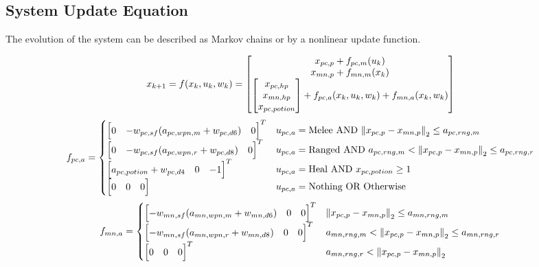 \documentclass[letterpaper, 10 pt, conference]{ieeeconf}
\begin{document}
\subsection{System Update Equation}
The evolution of the system can be described as Markov chains or by a nonlinear update function.

\begin{figure}[t]
    \begin{equation}\label{eq:sys_update_fun}
        x_{k+1} = f(x_k, u_k, w_k) = \mqty[
            x_{pc,p} + f_{pc,m}(u_k)\\
            x_{mn,p} + f_{mn,m}(x_k)\\
            \mqty[x_{pc,hp}\\ x_{mn,hp} \\ x_{pc,potion}] + f_{pc,a}(x_k,u_k,w_k) + f_{mn,a}(x_k,w_k)
        ]
    \end{equation}
    \begin{equation}\label{eq:f_pc_a}
        f_{pc,a} = \begin{cases}
            \mqty[0 & -w_{pc,sf}(a_{pc,wpn,m} + w_{pc,d6}) & 0]^T & u_{pc,a} = \text{Melee} \text{ AND } \norm{x_{pc,p} - x_{mn,p}}_2 \leq a_{pc,rng,m}\\
            \mqty[0 & -w_{pc,sf}(a_{pc,wpn,r} + w_{pc,d8}) & 0]^T & u_{pc,a} = \text{Ranged} \text{ AND } a_{pc,rng,m} < \norm{x_{pc,p} - x_{mn,p}}_2 \leq a_{pc,rng,r}\\
            \mqty[a_{pc,potion} + w_{pc,d4} & 0 & -1]^T & u_{pc,a} = \text{Heal} \text{ AND } x_{pc,potion} \geq 1\\%
            \mqty[0 & 0 & 0] & u_{pc,a} = \text{Nothing} \text{ OR } \text{Otherwise}
        \end{cases}
    \end{equation}
    \begin{equation}\label{eq:f_mn_a}
        f_{mn,a} = \begin{cases}
            \mqty[-w_{mn,sf}(a_{mn,wpn,m} + w_{mn,d6}) & 0 & 0]^T & \norm{x_{pc,p} - x_{mn,p}}_2 \leq a_{mn,rng,m}\\
            \mqty[- w_{mn,sf}(a_{mn,wpn,r} + w_{mn,d8}) & 0 & 0]^T & a_{mn,rng,m} < \norm{x_{pc,p} - x_{mn,p}}_2 \leq  a_{mn,rng,r}\\
            \mqty[0 & 0 & 0]^T &  a_{mn,rng,r} < \norm{x_{pc,p} - x_{mn,p}}_2
        \end{cases}
    \end{equation}


\end{figure}
\end{document}
